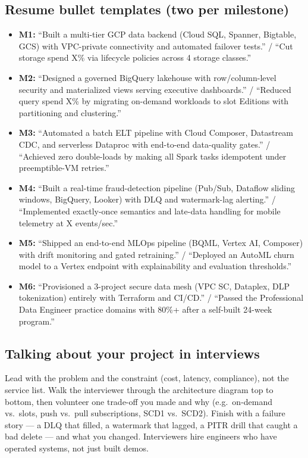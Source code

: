 \documentclass[11pt, a4paper]{article}
\begin{document}
\subsection*{Resume bullet templates (two per milestone)}
\begin{itemize}[label=-]
    \item \textbf{M1:} ``Built a multi-tier GCP data backend (Cloud SQL, Spanner, Bigtable, GCS) with VPC-private connectivity and automated failover tests.'' / ``Cut storage spend X\% via lifecycle policies across 4 storage classes.''
    \item \textbf{M2:} ``Designed a governed BigQuery lakehouse with row/column-level security and materialized views serving executive dashboards.'' / ``Reduced query spend X\% by migrating on-demand workloads to slot Editions with partitioning and clustering.''
    \item \textbf{M3:} ``Automated a batch ELT pipeline with Cloud Composer, Datastream CDC, and serverless Dataproc with end-to-end data-quality gates.'' / ``Achieved zero double-loads by making all Spark tasks idempotent under preemptible-VM retries.''
    \item \textbf{M4:} ``Built a real-time fraud-detection pipeline (Pub/Sub, Dataflow sliding windows, BigQuery, Looker) with DLQ and watermark-lag alerting.'' / ``Implemented exactly-once semantics and late-data handling for mobile telemetry at X events/sec.''
    \item \textbf{M5:} ``Shipped an end-to-end MLOps pipeline (BQML, Vertex AI, Composer) with drift monitoring and gated retraining.'' / ``Deployed an AutoML churn model to a Vertex endpoint with explainability and evaluation thresholds.''
    \item \textbf{M6:} ``Provisioned a 3-project secure data mesh (VPC SC, Dataplex, DLP tokenization) entirely with Terraform and CI/CD.'' / ``Passed the Professional Data Engineer practice domains with 80\%+ after a self-built 24-week program.''
\end{itemize}

\subsection*{Talking about your project in interviews}
Lead with the problem and the constraint (cost, latency, compliance), not the service list. Walk the interviewer through the architecture diagram top to bottom, then volunteer one trade-off you made and why (e.g.\ on-demand vs.\ slots, push vs.\ pull subscriptions, SCD1 vs.\ SCD2). Finish with a failure story --- a DLQ that filled, a watermark that lagged, a PITR drill that caught a bad delete --- and what you changed. Interviewers hire engineers who have operated systems, not just built demos.
\end{document}
